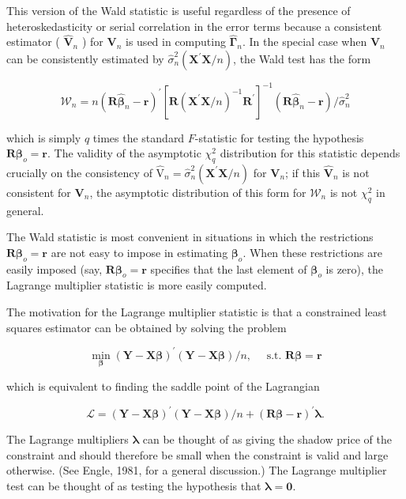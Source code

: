 \documentclass[10pt]{article}
\begin{document}
This version of the Wald statistic is useful regardless of the presence of heteroskedasticity or serial correlation in the error terms because a consistent estimator ( $\hat{\mathbf{V}}_{n}$ ) for $\mathbf{V}_{n}$ is used in computing $\hat{\boldsymbol{\Gamma}}_{n}$. In the special case when $\mathbf{V}_{n}$ can be consistently estimated by $\hat{\sigma}_{n}^{2}\left(\mathbf{X}^{\prime} \mathbf{X} / n\right)$, the Wald test has the form

$$
\mathcal{W}_{n}=n\left(\mathbf{R} \hat{\boldsymbol{\beta}}_{n}-\mathbf{r}\right)^{\prime}\left[\mathbf{R}\left(\mathbf{X}^{\prime} \mathbf{X} / n\right)^{-1} \mathbf{R}^{\prime}\right]^{-1}\left(\mathbf{R} \hat{\boldsymbol{\beta}}_{n}-\mathbf{r}\right) / \hat{\sigma}_{n}^{2}
$$

which is simply $q$ times the standard $F$-statistic for testing the hypothesis $\mathbf{R} \boldsymbol{\beta}_{o}=\mathbf{r}$. The validity of the asymptotic $\chi_{q}^{2}$ distribution for this statistic depends crucially on the consistency of $\hat{\mathrm{V}}_{n}=\hat{\sigma}_{n}^{2}\left(\mathbf{X}^{\prime} \mathbf{X} / n\right)$ for $\mathbf{V}_{n}$; if this $\hat{\mathbf{V}}_{n}$ is not consistent for $\mathbf{V}_{n}$, the asymptotic distribution of this form for $\mathcal{W}_{n}$ is not $\chi_{q}^{2}$ in general.

The Wald statistic is most convenient in situations in which the restrictions $\mathbf{R} \boldsymbol{\beta}_{o}=\mathbf{r}$ are not easy to impose in estimating $\boldsymbol{\beta}_{o}$. When these restrictions are easily imposed (say, $\mathbf{R} \boldsymbol{\beta}_{o}=\mathbf{r}$ specifies that the last element of $\boldsymbol{\beta}_{o}$ is zero), the Lagrange multiplier statistic is more easily computed.

The motivation for the Lagrange multiplier statistic is that a constrained least squares estimator can be obtained by solving the problem

$$
\min _{\boldsymbol{\beta}}(\mathbf{Y}-\mathbf{X} \boldsymbol{\beta})^{\prime}(\mathbf{Y}-\mathbf{X} \boldsymbol{\beta}) / n, \quad \text { s.t. } \mathbf{R} \boldsymbol{\beta}=\mathbf{r}
$$

which is equivalent to finding the saddle point of the Lagrangian

$$
\mathcal{L}=(\mathbf{Y}-\mathbf{X} \boldsymbol{\beta})^{\prime}(\mathbf{Y}-\mathbf{X} \boldsymbol{\beta}) / n+(\mathbf{R} \boldsymbol{\beta}-\mathbf{r})^{\prime} \boldsymbol{\lambda} .
$$

The Lagrange multipliers $\boldsymbol{\lambda}$ can be thought of as giving the shadow price of the constraint and should therefore be small when the constraint is valid and large otherwise. (See Engle, 1981, for a general discussion.) The Lagrange multiplier test can be thought of as testing the hypothesis that $\boldsymbol{\lambda}=\mathbf{0}$.
\end{document}
